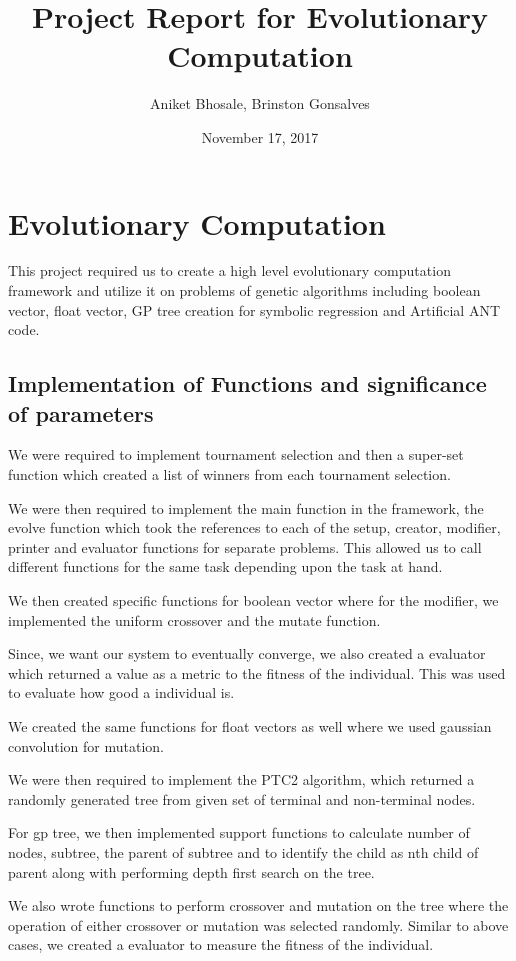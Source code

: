 \documentclass[]{report}
\title{Project Report for Evolutionary Computation}
\author{Aniket Bhosale, Brinston Gonsalves}
\date{November 17, 2017}
\begin{document}
\maketitle

\section{Evolutionary Computation}

This project required us to create a high level evolutionary computation framework and utilize it on problems of genetic algorithms including boolean vector, float vector, GP tree creation for symbolic regression and Artificial ANT code.

\subsection{Implementation of Functions and significance of parameters}

We were required to implement tournament selection and then a super-set function which created a list of winners from each tournament selection.

We were then required to implement the main function in the framework, the evolve function which took the references to each of the setup, creator, modifier, printer and evaluator functions for separate problems. This allowed us to call different functions for the same task depending upon the task at hand.

We then created specific functions for boolean vector where for the modifier, we implemented the uniform crossover and the mutate function. 

Since, we want our system to eventually converge, we also created a evaluator which returned a value as a metric to the fitness of the individual. This was used to evaluate how good a individual is.

We created the same functions for float vectors as well where we used gaussian convolution for mutation.

We were then required to implement the PTC2 algorithm, which returned a randomly generated tree from given set of terminal and non-terminal nodes.

For gp tree, we then implemented support functions to calculate number of nodes, subtree, the parent of subtree and to identify the child as nth child of parent along with performing depth first search on the tree.

We also wrote functions to perform crossover and mutation on the tree where the operation of either crossover or mutation was selected randomly. Similar to above cases, we created a evaluator to measure the fitness of the individual.
\end{document}
